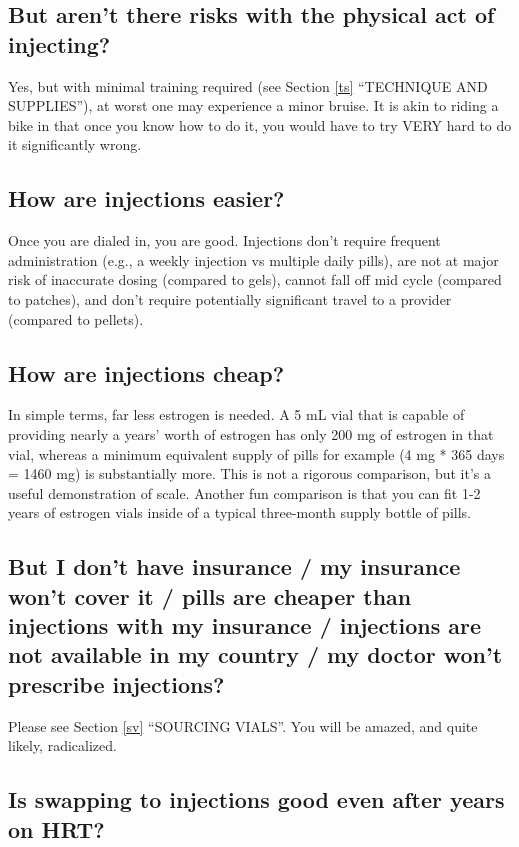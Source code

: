 \documentclass{article}
\begin{document}
\subsection{But aren’t there risks with the physical act of injecting?}

Yes, but with minimal training required (see Section \ref{ts} “TECHNIQUE AND SUPPLIES”), at worst one may experience a minor bruise. It is akin to riding a bike in that once you know how to do it, you would have to try VERY hard to do it significantly wrong.

\subsection{How are injections easier?}

Once you are dialed in, you are good. Injections don’t require frequent administration (e.g., a weekly injection vs multiple daily pills), are not at major risk of inaccurate dosing (compared to gels), cannot fall off mid cycle (compared to patches), and don’t require potentially significant travel to a provider (compared to pellets).

\subsection{How are injections cheap?}

In simple terms, far less estrogen is needed. A 5 mL vial that is capable of providing nearly a years’ worth of estrogen has only 200 mg of estrogen in that vial, whereas a minimum equivalent supply of pills for example (4 mg * 365 days = 1460 mg) is substantially more. This is not a rigorous comparison, but it’s a useful demonstration of scale. Another fun comparison is that you can fit 1-2 years of estrogen vials inside of a typical three-month supply bottle of pills.

\subsection{But I don’t have insurance / my insurance won’t cover it / pills are cheaper than injections with my insurance / injections are not available in my country / my doctor won’t prescribe injections?}

Please see Section \ref{sv} “SOURCING VIALS”. You will be amazed, and quite likely, radicalized.

\subsection{Is swapping to injections good even after years on HRT?}
\end{document}
